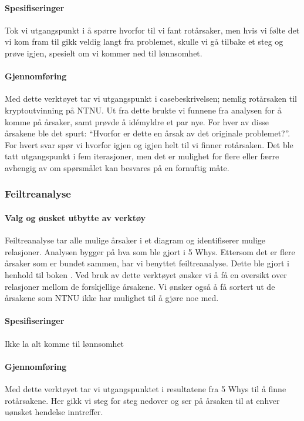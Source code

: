 \paragraph{Spesifiseringer}
Tok vi utgangspunkt i å spørre hvorfor til vi fant rotårsaker, men hvis vi følte det vi kom fram til gikk veldig langt fra problemet, skulle vi gå tilbake et steg og prøve igjen, spesielt om vi kommer ned til lønnsomhet. 

\paragraph{Gjennomføring}
Med dette verktøyet tar vi utgangspunkt i casebeskrivelsen; nemlig rotårsaken til kryptoutvinning på NTNU. Ut fra dette brukte vi funnene fra analysen for å komme på årsaker, samt prøvde å idémyldre et par nye. For hver av disse årsakene ble det spurt: ``Hvorfor er dette en årsak av det originale problemet?''. For hvert svar spør vi hvorfor igjen og igjen helt til vi finner rotårsaken. Det ble tatt utgangspunkt i fem iterasjoner, men det er mulighet for flere eller færre avhengig av om spørsmålet kan besvares på en fornuftig måte. 

\subsubsection{Feiltreanalyse}
\paragraph{Valg og ønsket utbytte av verktøy}
Feiltreanalyse tar alle mulige årsaker i et diagram og identifiserer mulige relasjoner. Analysen bygger på hva som ble gjort i 5 Whys. Ettersom det er flere årsaker som er bundet sammen, har vi benyttet feiltreanalyse. Dette ble gjort i henhold til boken \cite{RCA}.
Ved bruk av dette verktøyet ønsker vi å få en oversikt over relasjoner mellom de forskjellige årsakene. Vi ønsker også å få sortert ut de årsakene som NTNU ikke har mulighet til å gjøre noe med.

\paragraph{Spesifiseringer}
Ikke la alt komme til lønnsomhet

\paragraph{Gjennomføring}
Med dette verktøyet tar vi utgangspunktet i resultatene fra 5 Whys til å finne rotårsakene. Her gikk vi steg for steg nedover og ser på årsaken til at enhver uønsket hendelse inntreffer.


